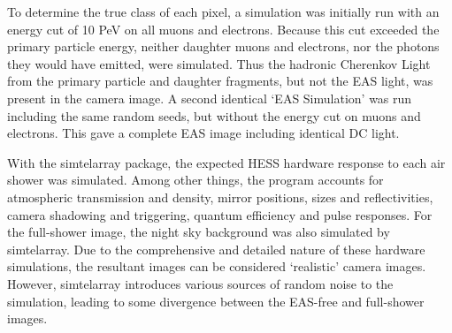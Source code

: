 \documentclass[]{article}
\begin{document}
To determine the true class of each pixel, a simulation was initially run with an energy cut of 10 PeV on all muons and electrons. Because this cut exceeded the primary particle energy, neither daughter muons and electrons, nor the photons they would have emitted, were simulated. Thus the hadronic Cherenkov Light from the primary particle and daughter fragments, but not the EAS light, was present in the camera image. A second identical \textquoteleft EAS Simulation' was run including the same random seeds, but without the energy cut on muons and electrons. This gave a complete EAS image including identical DC light.

With the sim\textunderscore telarray package, the expected HESS hardware response to each air shower was simulated. Among other things, the program accounts for atmospheric transmission and density, mirror positions, sizes and reflectivities, camera shadowing and triggering, quantum efficiency and pulse responses. For the full-shower image, the night sky background was also simulated by sim\textunderscore telarray. Due to the comprehensive and detailed nature of these hardware simulations, the resultant images can be considered \textquoteleft realistic' camera images.  However, sim\textunderscore telarray introduces various sources of random noise to the simulation, leading to some divergence between the EAS-free and full-shower images.
\end{document}
